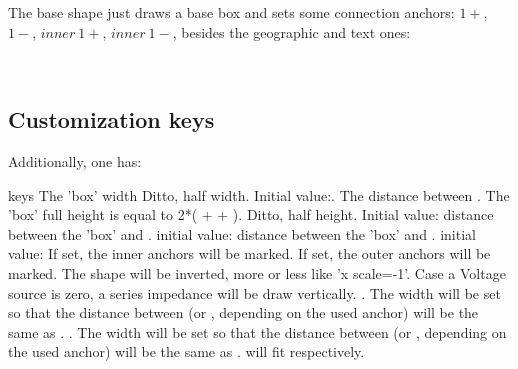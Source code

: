 \documentclass[a4paper, titlepage]{article}
\begin{document}
The base shape just draws a base box and sets some connection anchors: $1+$, $1-$, $inner\ 1+$, $inner\ 1-$, besides the geographic and text ones:

        
~   

\subsection{Customization keys}\label{BBkeys}

Additionally, one has:

\begin{describelist*}[30mm]{keys}
    {The 'box' width}
    {Ditto, half width. Initial value:.}
    {The distance between . The 'box' full height is equal to 2*( +  + ).}
   {Ditto, half height. Initial value: }
   {distance between the 'box' and . initial value: }
   {distance between the 'box' and . initial value: }
    {If set, the inner anchors will be marked.}
    {If set, the outer anchors will be marked.}
   {The shape will be inverted, more or less like 'x scale=-1'.}
   {Case a Voltage source is zero, a series impedance will be draw vertically.}
   {. The width will be set so that the distance between  (or , depending on the used anchor) will be the same as .}
   {. The width will be set so that the distance between  (or , depending on the used anchor) will be the same as }
   {.   will fit  respectively.}
\end{describelist*}
\end{document}
